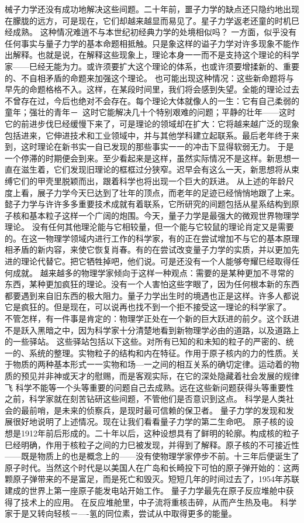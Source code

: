 械子力学还没有成功地解决这些间题。二十年前，噩子力学的缺点还只隐约地出现在朦胧的远方，可是现在，它们却越来越显而易见了。星子力学返老还童的时机巳经成熟。
这种情况难逍不与本世纪初经典力学的处境相似吗？
一方面，似乎没有任何事实与量子力学的基本命题相抵触。只是象这样的谥子力学对许多现象不能作出解释。也就是说，在解释这些现象上，理论本身一一而不是支持这个理论的科学家——巳经无能为力。或许须要扩大这个理论的体系，也或许须要增揉新的、重要的、不自相矛盾的命题来加强这个理论。
也可能出现这种情况：这些新命题将与早先的命题格格不入。这样，在某段时间里，我们将会感到失望。全能的理论过去不曾存在过，今后也绝对不会存在。每个理论大体就像人的一生：它有自己柔弱的童年；强壮的青年－~这时它能解决几十个特别艰难的问题；平静的壮年——这时它的前进步伐巳经缓慢下来了，可是理论的领域却在扩大：它将越来越广泛的现象包括进来，它伸进技术和工业领域中，并与其他学科建立起联系。最后老年终于来到，这时理论在新书实一自已发现的那些事实一一的冲击下显得软弱无力。
于是一个停滞的时期便会到来。至少看起来是这样，虽然实际情况不是这样。新思想一直在滋生着，它们发现旧理论的框框过分狭窄。迟早会有这么一天，新思想将从束缚它们的甲壳里脱颖而出，跟着科学也将出现一个巨大的跃进。
从上述的年龄尺度上看，展子力学今天巳达到了壮年的顶点，而老年的足迹已经悄悄地跟了上来。懿子力学与许许多多重要技术成就有着联系，它所研究的间题包括从星系结构到原子核和基本粒子这样一个广阔的炮围。今天，量子力学是最强大的微观世界物理学理论。
没有任何其他理沦能与它相较量，但一个能与它较鼠的理论肖定又是需要的。在这一物理学领域内进行工作的科学家，有的正在尝试增加不与它的基本原理相矛盾的新内容，来使它恢复肖春。有的在尝试改变量子力学的实质，并以更加先进的理论代替它。把它牺牲掉吧，他们说。可是还没有一个人能够夸耀巳经取得任何成就。
越来越多的物理学家倾向于这样一种观点：需要的是某种更加不寻常的东西，某种更加疯狂的理论。没有一个人害怕这些字眼了，因为任何根本新的东西都要遇到来自旧东西的极大阻力。量子力学出生时的境遇也正是这样。许多人都说它是疯狂的。但是现在，可以说再也找不到一个拒不接受这一理论的科学家了。
不管怎样，有一件事是肯定的：物理学正处在一个新的巨大跃进的前夕。这个跃进不是跃入黑暗之中，因为科学家十分清楚地看到新物理学必由的道路，以及道路上的一些驿站。
这些驿站包括以下这些。对所有已知的和未知的粒子的严密的、统一的、系统的整理。实物粒子的结构和内在特征。作用于原子核内的力的性质。关于物质的两种基本形式一一实物和场—一之间的相互关系的确切定律。运动着的物质的预见并非神或天才的慰赐，而是客观实际，在它的深处隐藏着社会发展的规律飞
科学不能等一个头等重要的问题自己去成熟。远在这些新问题获得头等重要性之前，科学家就在刻苦钻研这些间题，不管他们是否意识到这点。
科学是人类社会的最前哨，是未来的侦察兵，是现时最可信赖的保卫者。
量子力学的发现和发展很好地说明了上述情况。现在让我们看看量子力学的第二生命吧。
原子核的设想是1912年前后形成的。二十年以后，这种设想具有了鲜明的轮廓。构成核的粒子巳经明确，作用于核粒子之间的力巳被发现，并得到了解释。原子核的不可接近性——既是物质上的也是概念上的——没有使物理学家停步不前。十三年后便诞生了原子时代。当然这个时代是以美国人在广岛和长畸投下可怕的原子弹开始的：这两颗原子弹带来的不是富足，而是死亡和毁灭。短短几年的时间过去了，1954年苏联建成的世界上第一座原子能发电站开始工作。
量子力学最先在原子反应堆舱中获得了技术上的应用。
在反应堆舱里，中子流将重核击碎，从而产生热及电。
科学家于是又转向轻核－—-氢的同位素，尝试从中取得更多的能量。


